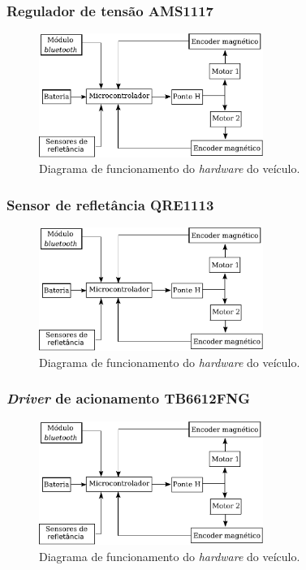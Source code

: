 \begin{frame}
\frametitle{Regulador de tensão AMS1117}

\begin{figure}[th]
	\centering
	\includegraphics[width=0.65\textwidth,keepaspectratio]{Figuras/DiagramaHW.pdf}
	\caption{Diagrama de funcionamento do \textit{hardware} do veículo.\label{fig:diagEl}}
\end{figure}
\end{frame}


\begin{frame}
\frametitle{Sensor de refletância QRE1113}

\begin{figure}[th]
	\centering
	\includegraphics[width=0.65\textwidth,keepaspectratio]{Figuras/DiagramaHW.pdf}
	\caption{Diagrama de funcionamento do \textit{hardware} do veículo.\label{fig:diagEl}}
\end{figure}
\end{frame}


\begin{frame}
\frametitle{\textit{Driver} de acionamento TB6612FNG}

\begin{figure}[th]
	\centering
	\includegraphics[width=0.65\textwidth,keepaspectratio]{Figuras/DiagramaHW.pdf}
	\caption{Diagrama de funcionamento do \textit{hardware} do veículo.\label{fig:diagEl}}
\end{figure}
\end{frame}

